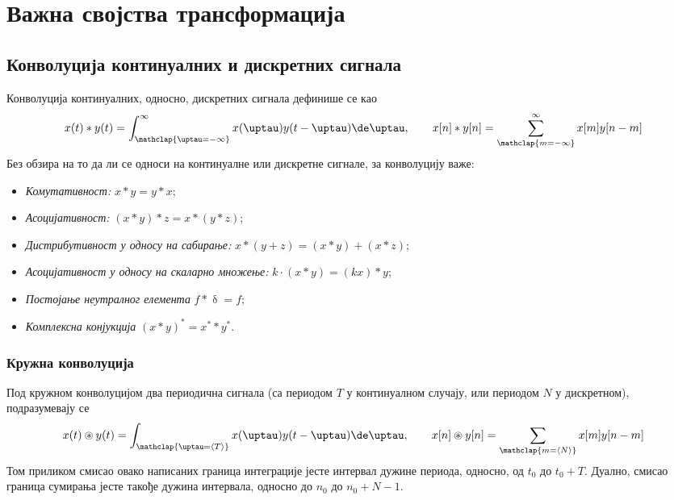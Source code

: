 \renewcommand{\thechapter}{S}
\setcounter{section}{0}
\chapter{Важна својства трансформација} \label{a:svojstva}


\section*{Конволуција континуалних и дискретних сигнала}
Конволуција континуалних, односно, дискретних сигнала дефинише се као 
\begin{equation}
    x(t) \ast y(t) = \int_{\mathclap{\uptau = -\infty}}^{\infty} x(\uptau) y(t-\uptau) \de \uptau, 
    \qquad
    x[n] \ast y[n] = \sum_{\mathclap{m = -\infty}}^{\infty} x[m] y[n-m] 
\end{equation}
Без обзира на то да ли се односи на континуалне или дискретне сигнале, за конволуцију важе:
\begin{itemize}\itemsep0pt
    \item \emph{Комутативност:} $x \ast y = y \ast x$;
    \item \emph{Асоцијативност:} $(x \ast y) \ast z = x \ast (y \ast z)$;
    \item \emph{Дистрибутивност у односу на сабирање:} $x \ast (y + z) = (x \ast y) + (x \ast z)$;
    \item \emph{Асоцијативност у односу на скаларно множење:} $k \cdot (x \ast y) = (kx) \ast y$; 
    \item \emph{Постојање неутралног елемента} $f \ast \updelta = f$; 
    \item \emph{Комплексна конјукција} $(x \ast y)^\ast = x^{\ast} \ast y^{\ast}$.
\end{itemize}

\subsection*{Кружна конволуција}
Под кружном конволуцијом два периодична сигнала (са периодом $T$ у континуалном случају, или 
периодом $N$ у дискретном), подразумевају се 
\begin{equation}
    x(t) \circledast y(t) = \int_{\mathclap{\uptau = \langle T \rangle }} x(\uptau) y(t-\uptau) \de \uptau, 
    \qquad
    x[n] \circledast y[n] = \sum_{\mathclap{m = \langle N \rangle }} x[m] y[n-m] 
\end{equation}
Том приликом смисао овако написаних граница интеграције јесте интервал дужине периода, односно, од $t_0$ до $t_0 + T$. 
Дуално, смисао граница сумирања јесте такође дужина интервала, односно до $n_0$ до $n_0 + N - 1$. 

